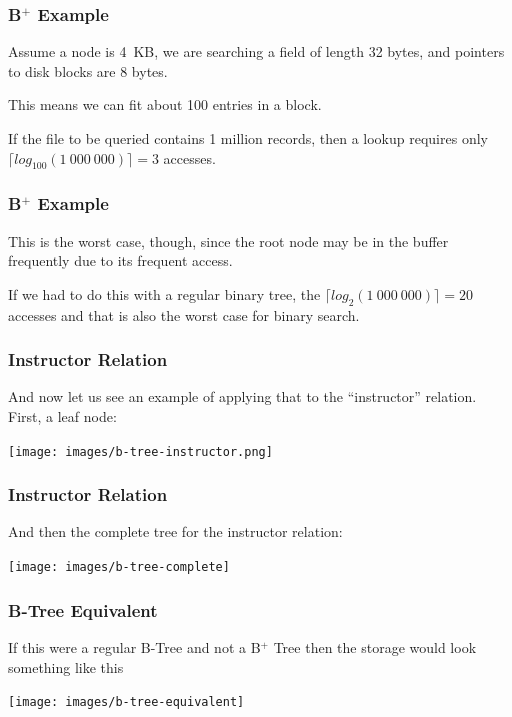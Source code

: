 \begin{frame}
\frametitle{B$^{+}$ Example}

Assume a node is 4~KB, we are searching a field of length 32 bytes, and pointers to disk blocks are 8 bytes. 

This means we can fit about 100 entries in a block. 

If the file to be queried contains 1 million records, then a lookup requires only $\lceil log_{100}(1~000~000) \rceil = 3$ accesses. 
\end{frame}

\begin{frame}
\frametitle{B$^{+}$ Example}

This is the worst case, though, since the root node may be in the buffer frequently due to its frequent access. 

If we had to do this with a regular binary tree, the $\lceil log_{2}(1~000~000) \rceil = 20$ accesses and that is also the worst case for binary search.


\end{frame}

\begin{frame}
\frametitle{Instructor Relation}

And now let us see an example of applying that to the ``instructor'' relation. First, a leaf node:

\begin{center}
	\texttt{[image: images/b-tree-instructor.png]}
\end{center}

\end{frame}

\begin{frame}
\frametitle{Instructor Relation}

And then the complete tree for the instructor relation:

\begin{center}
	\texttt{[image: images/b-tree-complete]}
\end{center}

\end{frame}



\begin{frame}
\frametitle{B-Tree Equivalent}

If this were a regular B-Tree and not a B$^{+}$ Tree then the storage would look something like this

\begin{center}
	\texttt{[image: images/b-tree-equivalent]}
\end{center}

\end{frame}

